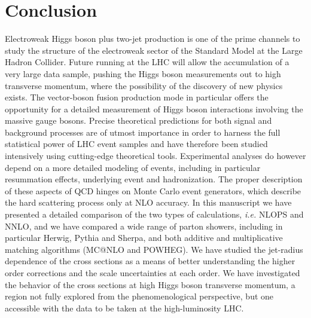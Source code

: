 \documentclass[10pt,prd,fleqn,superscriptaddress,notitlepage,nofootinbib,preprintnumbers,nobalancelastpage]{revtex4-1}
\begin{document}
\section{Conclusion}
\label{sec:conclusions}
Electroweak Higgs boson plus two-jet production is one of the prime channels to study the structure of the electroweak sector of the Standard Model at the Large Hadron Collider. Future running at the  LHC will allow the accumulation of a very large data sample, pushing the Higgs boson measurements out to high transverse momentum, where the possibility of the discovery of new physics exists. The vector-boson fusion production mode in particular offers the opportunity for a detailed measurement of Higgs boson interactions involving the massive gauge bosons. Precise theoretical predictions for both signal and background processes are of utmost importance in order to harness the full statistical power of LHC event samples and have therefore been studied intensively using cutting-edge theoretical tools. Experimental analyses do however depend on a more detailed modeling of events, including in particular resummation effects, underlying event and hadronization. The proper description of these aspects of QCD hinges on Monte Carlo event generators, which describe the hard scattering process only at NLO accuracy. In this manuscript we have presented a detailed comparison of the two types of calculations, \emph{i.e.} NLOPS and NNLO, and we have compared a wide range of parton showers, including in particular Herwig, Pythia and Sherpa,
and both  additive and multiplicative matching algorithms (MC@NLO and POWHEG). We have studied the jet-radius dependence of the cross sections as a means of better understanding the higher order corrections and the scale uncertainties at each order. We have investigated the behavior of the cross sections at high Higgs boson transverse momentum, a region not fully explored from the phenomenological perspective, but one accessible with the data to be taken at the high-luminosity LHC.
\end{document}
